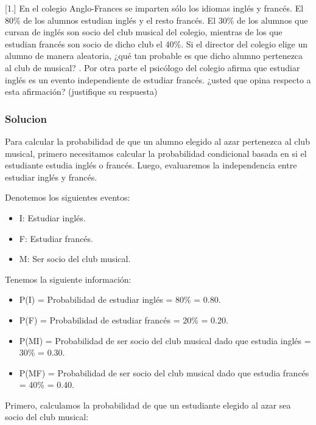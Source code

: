 \documentclass[
]{article}
\providecommand{\tightlist}{%
  \setlength{\itemsep}{0pt}\setlength{\parskip}{0pt}}
\begin{document}
{[}1.{]} En el colegio Anglo-Frances se imparten sólo los idiomas inglés
y francés. El 80\% de los alumnos estudian inglés y el resto francés. El
30\% de los alumnos que cursan de inglés son socio del club musical del
colegio, mientras de los que estudian francés son socio de dicho club el
40\%. Si el director del colegio elige un alumno de manera aleatoria,
¿qué tan probable es que dicho alumno pertenezca al club de musical? .
Por otra parte el psicólogo del colegio afirma que estudiar inglés es un
evento independiente de estudiar francés. ¿usted que opina respecto a
esta afirmación? (justifique su respuesta)

\hypertarget{solucion-3}{%
\subsubsection{\texorpdfstring{\textbf{Solucion}}{Solucion}}\label{solucion-3}}

Para calcular la probabilidad de que un alumno elegido al azar
pertenezca al club musical, primero necesitamos calcular la probabilidad
condicional basada en si el estudiante estudia inglés o francés. Luego,
evaluaremos la independencia entre estudiar inglés y francés.

Denotemos los siguientes eventos:

\begin{itemize}
\tightlist
\item
  I: Estudiar inglés.
\item
  F: Estudiar francés.
\item
  M: Ser socio del club musical.
\end{itemize}

Tenemos la siguiente información:

\begin{itemize}
\tightlist
\item
  P(I) = Probabilidad de estudiar inglés = 80\% = 0.80.
\item
  P(F) = Probabilidad de estudiar francés = 20\% = 0.20.
\item
  P(M\textbar I) = Probabilidad de ser socio del club musical dado que
  estudia inglés = 30\% = 0.30.
\item
  P(M\textbar F) = Probabilidad de ser socio del club musical dado que
  estudia francés = 40\% = 0.40.
\end{itemize}

Primero, calculamos la probabilidad de que un estudiante elegido al azar
sea socio del club musical:
\end{document}
